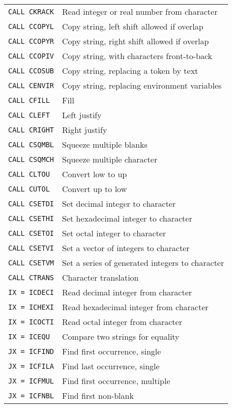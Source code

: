 \begin{tabular}[t]{l@{\qquad}l}
{\tt CALL CKRACK}  & Read integer or real number from character\\
{\tt CALL CCOPYL}  & Copy string, left shift allowed if overlap\\
{\tt CALL CCOPYR}  & Copy string, right shift allowed if overlap\\
{\tt CALL CCOPIV}  & Copy string, with characters front-to-back\\
{\tt CALL CCOSUB}  & Copy string, replacing a token by text\\
{\tt CALL CENVIR}  & Copy string, replacing environment variables\\
{\tt CALL CFILL}   & Fill\\
{\tt CALL CLEFT}   & Left justify\\
{\tt CALL CRIGHT}  & Right justify\\
{\tt CALL CSQMBL}  & Squeeze multiple blanks\\
{\tt CALL CSQMCH}  & Squeeze multiple character\\
{\tt CALL CLTOU}   & Convert low to up\\
{\tt CALL CUTOL}   & Convert up to low\\
{\tt CALL CSETDI}  & Set decimal integer to character\\
{\tt CALL CSETHI}  & Set hexadecimal integer to character\\
{\tt CALL CSETOI}  & Set octal integer to character\\
{\tt CALL CSETVI}  & Set a vector of integers to character\\
{\tt CALL CSETVM}  & Set a series of generated integers to character\\
{\tt CALL CTRANS}  & Character translation\\
{\tt IX = ICDECI}  & Read decimal integer from character\\
{\tt IX = ICHEXI}  & Read hexadecimal integer from character\\
{\tt IX = ICOCTI}  & Read octal integer from character\\
{\tt IX = ICEQU}   & Compare two strings for equality\\
{\tt JX = ICFIND}  & Find first occurrence, single\\
{\tt JX = ICFILA}  & Find last occurrence, single\\
{\tt JX = ICFMUL}  & Find first occurrence, multiple\\
{\tt JX = ICFNBL}  & Find first non-blank\\
\end{tabular}
